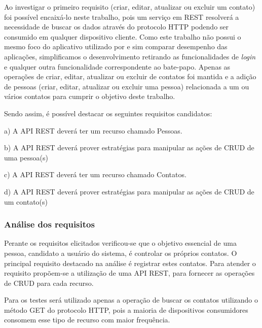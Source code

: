   Ao investigar o primeiro requisito (criar, editar, atualizar ou excluir um contato) foi possível encaixá-lo neste trabalho,
  pois um serviço em REST resolverá a necessidade de buscar os dados através do protocolo HTTP 
  podendo ser consumido em qualquer dispositivo cliente. Como este trabalho não possui o mesmo foco do aplicativo utilizado por 
  e sim comparar desempenho das aplicações, simplificamos o desenvolvimento retirando as funcionalidades
  de \textit{login} e qualquer outra funcionalidade correspondente ao bate-papo. Apenas as operações de criar, editar,
  atualizar ou excluir de contatos foi mantida e a adição de pessoas (criar, editar, atualizar ou excluir uma pessoa)
  relacionada a um ou vários contatos para cumprir o objetivo deste trabalho.

  Sendo assim, é possível destacar os seguintes requisitos candidatos:

  \begin{compactitem}
    \item[a)] A \ac{API} \ac{REST} deverá ter um recurso chamado Pessoas.
    \item[b)] A \ac{API} \ac{REST} deverá prover estratégias para manipular as ações de CRUD de uma pessoa(s)
    \item[c)] A \ac{API} \ac{REST} deverá ter um recurso chamado Contatos.
    \item[d)] A \ac{API} \ac{REST} deverá prover estratégias para manipular as ações de CRUD de um contato(s)
  \end{compactitem}
  
\subsubsection{Análise dos requisitos}
  
  Perante os requisitos elicitados verificou-se que o objetivo essencial de uma pessoa, candidato a usuário
  do sistema, é controlar os próprios contatos.
  O principal requisito destacado na análise é registrar estes contatos. Para atender o requisito
  propõem-se a utilização de uma \ac{API} \ac{REST}, para fornecer as operações de CRUD para cada recurso.
  
  Para os testes será utilizado apenas a operação de buscar os contatos utilizando o método GET 
  do protocolo HTTP, pois a maioria de dispositivos consumidores consomem esse tipo de
  recurso com maior frequência.
 
